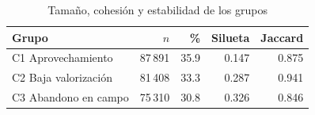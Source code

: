 \begin{table}[!htb]
\centering
\caption{Tamaño, cohesión y estabilidad de los grupos}
\label{tab:validacion}
\footnotesize
\setlength{\tabcolsep}{3pt}
\begin{tabular}{@{}lrrrr@{}}
\toprule
Grupo & $n$ & \% & Silueta & Jaccard \\
\midrule
C1 Aprovechamiento & 87\,891 & 35.9 & 0.147 & 0.875 \\
C2 Baja valorización & 81\,408 & 33.3 & 0.287 & 0.941 \\
C3 Abandono en campo & 75\,310 & 30.8 & 0.326 & 0.846 \\
\bottomrule
\end{tabular}
\end{table}
